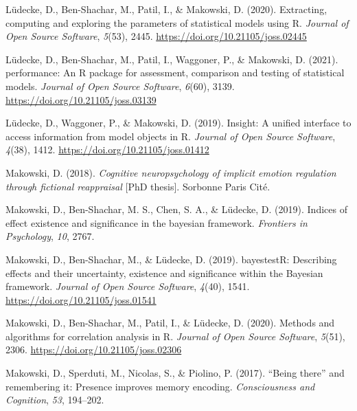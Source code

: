 \documentclass[
  man,floatsintext]{apa6}
\newlength{\cslhangindent}
\newlength{\cslentryspacingunit} %
\newenvironment{CSLReferences}[2] %
 {%
  \setlength{\parindent}{0pt}
  \ifodd #1
  \let\oldpar\par
  \def\par{\hangindent=\cslhangindent\oldpar}
  \fi
  \setlength{\parskip}{#2\cslentryspacingunit}
 }%
 {}
\begin{document}
\begin{CSLReferences}{1}{0}
\leavevmode{}%
Lüdecke, D., Ben-Shachar, M., Patil, I., \& Makowski, D. (2020). Extracting, computing and exploring the parameters of statistical models using {R}. \emph{Journal of Open Source Software}, \emph{5}(53), 2445. \url{https://doi.org/10.21105/joss.02445}

\leavevmode{}%
Lüdecke, D., Ben-Shachar, M., Patil, I., Waggoner, P., \& Makowski, D. (2021). {performance}: An {R} package for assessment, comparison and testing of statistical models. \emph{Journal of Open Source Software}, \emph{6}(60), 3139. \url{https://doi.org/10.21105/joss.03139}

\leavevmode{}%
Lüdecke, D., Waggoner, P., \& Makowski, D. (2019). Insight: A unified interface to access information from model objects in {R}. \emph{Journal of Open Source Software}, \emph{4}(38), 1412. \url{https://doi.org/10.21105/joss.01412}

\leavevmode{}%
Makowski, D. (2018). \emph{Cognitive neuropsychology of implicit emotion regulation through fictional reappraisal} {[}PhD thesis{]}. Sorbonne Paris Cit{é}.

\leavevmode{}%
Makowski, D., Ben-Shachar, M. S., Chen, S. A., \& Lüdecke, D. (2019). Indices of effect existence and significance in the bayesian framework. \emph{Frontiers in Psychology}, \emph{10}, 2767.

\leavevmode{}%
Makowski, D., Ben-Shachar, M., \& Lüdecke, D. (2019). {bayestestR}: Describing effects and their uncertainty, existence and significance within the {Bayesian} framework. \emph{Journal of Open Source Software}, \emph{4}(40), 1541. \url{https://doi.org/10.21105/joss.01541}

\leavevmode{}%
Makowski, D., Ben-Shachar, M., Patil, I., \& Lüdecke, D. (2020). Methods and algorithms for correlation analysis in {R}. \emph{Journal of Open Source Software}, \emph{5}(51), 2306. \url{https://doi.org/10.21105/joss.02306}

\leavevmode{}%
Makowski, D., Sperduti, M., Nicolas, S., \& Piolino, P. (2017). {``Being there''} and remembering it: Presence improves memory encoding. \emph{Consciousness and Cognition}, \emph{53}, 194--202.


\end{CSLReferences}
\end{document}
